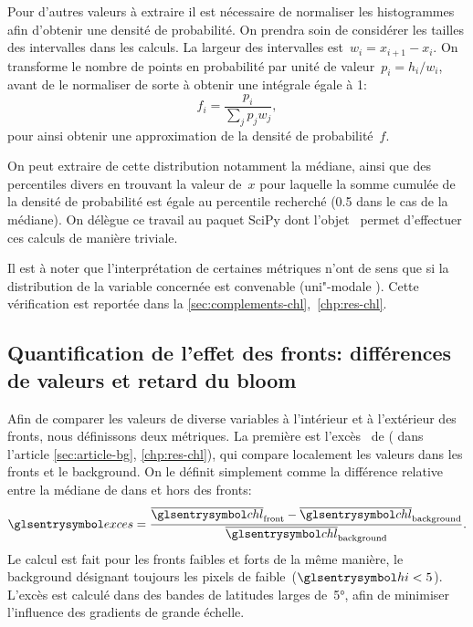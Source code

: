 Pour d'autres valeurs à extraire il est nécessaire de normaliser les histogrammes afin d'obtenir une densité de probabilité. On prendra soin de considérer les tailles des intervalles dans les calculs.
La largeur des intervalles est~\(w_i = x_{i+1}-x_i\). On transforme le nombre de points en probabilité par unité de valeur~\(p_i = h_i / w_i \), avant de le normaliser de sorte à obtenir une intégrale égale à 1:
\begin{equation}
  f_i = \frac{p_i} {\sum_j p_j w_j},
\end{equation}
pour ainsi obtenir une approximation de la densité de probabilité~\(f\).

On peut extraire de cette distribution notamment la médiane, ainsi que des percentiles divers en trouvant la valeur de~\(x\) pour laquelle la somme cumulée de la densité de probabilité est égale au percentile recherché (\num{0.5} dans le cas de la médiane).
On délègue ce travail au paquet SciPy dont l'objet~ permet d'effectuer ces calculs de manière triviale.

Il est à noter que l'interprétation de certaines métriques n'ont de sens que si la distribution de la variable concernée est convenable (uni"-modale ).
Cette vérification est reportée dans la \cref{sec:complements-chl},~\cref*{chp:res-chl}.

\subsection{Quantification de l'effet des fronts: différences de valeurs et retard du bloom}
\label{sec:extraction-surplus-lag}

Afin de comparer les valeurs de diverse variables à l'intérieur et à l'extérieur des fronts, nous définissons deux métriques.
La première est l'excès~ de  ( dans l'article \cref{sec:article-bg}, \cref*{chp:res-chl}), qui compare localement les valeurs dans les fronts et le background. On le définit simplement comme la différence relative entre la médiane de  dans et hors des fronts:
\begin{equation}
  \am{exces} = \frac{\med{\am{chl}}_\frt - \med{\am{chl}}_\bkg}
  {\med{\am{chl}}_\bkg} .
\end{equation}
Le calcul est fait pour les fronts faibles et forts de la même manière, le background désignant toujours les pixels de  faible~(\(\am{hi} < 5\)).
L'excès est calculé dans des bandes de latitudes larges de~\ang{5}, afin de minimiser l'influence des gradients de grande échelle.


